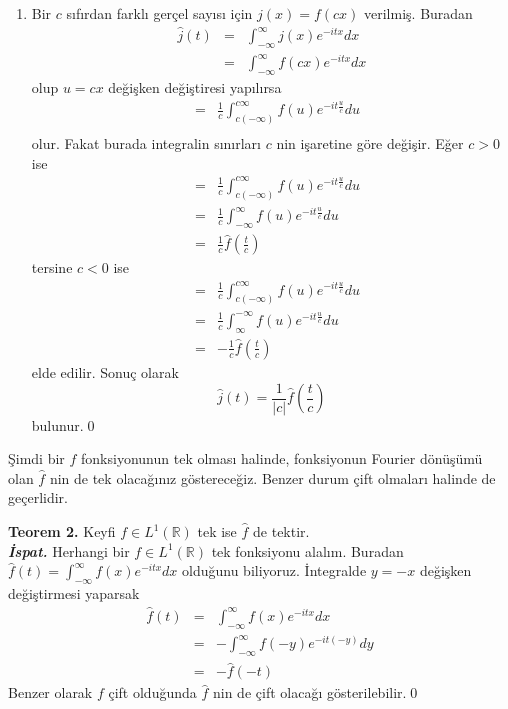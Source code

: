 \documentclass[a4paper, 9pt]{article}
\begin{document}
\begin{enumerate}
	\item Bir $c$ sıfırdan farklı gerçel sayısı için $j(x)=f(cx)$ verilmiş. Buradan
		\begin{eqnarray*}
		\widehat{j}(t)  &=&  \int_{-\infty }^{\infty } j(x) e^{-itx}dx  \\ 
		&=&  \int_{-\infty }^{\infty } f(cx) e^{-itx}dx
		\end{eqnarray*}
		olup $u=cx$ değişken değiştiresi yapılırsa
		\begin{eqnarray*}
		&=& \frac{1}{c} \int_{c (-\infty) }^{c \infty } f(u)e^{-it\frac{u}{c}} du \\   
		\end{eqnarray*}
		olur. Fakat burada integralin sınırları $c$ nin işaretine göre değişir. Eğer $c>0$ ise
		\begin{eqnarray*}
		&=& \frac{1}{c} \int_{c (-\infty) }^{c \infty } f(u)e^{-it\frac{u}{c}} du \\   
		&=& \frac{1}{c} \int_{-\infty }^{\infty } f(u)e^{-it\frac{u}{c}} du \\  
		&=& \frac{1}{c} \widehat{f}(\frac{t}{c}) 
		\end{eqnarray*}
		tersine $c<0$ ise
		\begin{eqnarray*}
		&=& \frac{1}{c} \int_{c (-\infty) }^{c \infty } f(u)e^{-it\frac{u}{c}} du \\   
		&=& \frac{1}{c} \int_{\infty }^{-\infty } f(u)e^{-it\frac{u}{c}} du \\  
		&=& -\frac{1}{c} \widehat{f}(\frac{t}{c}) 
		\end{eqnarray*}
		elde edilir. Sonuç olarak
		$$ \widehat{j}(t) = \frac{1}{\left | c \right |} \widehat{f}(\frac{t}{c}) $$
		bulunur.\qed
\end{enumerate}

Şimdi bir $f$ fonksiyonunun tek olması halinde, fonksiyonun Fourier dönüşümü olan $\widehat{f}$ nin de tek olacağınız göstereceğiz. Benzer durum çift olmaları halinde de geçerlidir.

\textbf{Teorem 2.} Keyfi $f \in L^1(\mathbb{R})$ tek ise  $\widehat{f}$ de tektir.\\
\textit{\textbf{İspat.}} 
Herhangi bir $f \in L^1(\mathbb{R})$ tek fonksiyonu alalım. Buradan	$\widehat{f}(t) =  \int_{-\infty }^{\infty } f(x) e^{-itx}dx$ olduğunu biliyoruz. İntegralde $y=-x$ değişken değiştirmesi yaparsak  
	\begin{eqnarray*} 
		\widehat{f}(t) &=&  \int_{-\infty }^{\infty } f(x) e^{-itx}dx\\
		&=& - \int_{-\infty }^{ \infty } f(-y)e^{-it(-y)} dy \\   
		&=& -\widehat{f}(-t) 
	\end{eqnarray*}
Benzer olarak $f$ çift olduğunda $\widehat{f}$ nin de çift olacağı gösterilebilir.\qed
\end{document}
